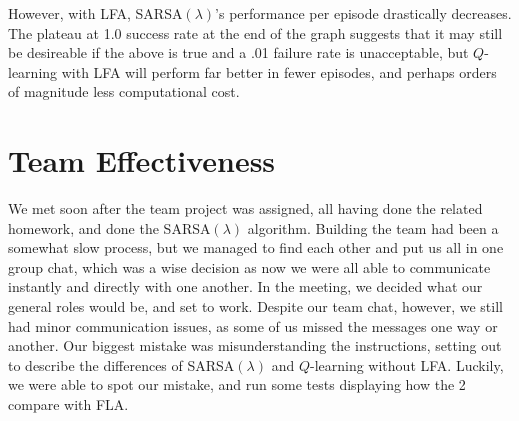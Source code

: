 \documentclass[10pt,conference]{IEEEtran}
\begin{document}
However, with LFA, SARSA\((\lambda)\)'s performance per episode drastically 
decreases. The plateau at 1.0 success rate at the end of the graph suggests that 
it may still be desireable if the above is true and a .01 failure rate is unacceptable, 
but \(Q\)-learning with LFA will perform far better in fewer episodes, and perhaps orders of magnitude less computational cost.


\section{Team Effectiveness}
We met soon after the team project was assigned, all having done the related homework, and done the SARSA\((\lambda)\) algorithm. Building the team had been a somewhat slow process, but we managed to find each other and put us all in one group chat, which was a wise decision as now we were all able to communicate instantly and directly with one another. In the meeting, we decided what our general roles would be, and set to work. Despite our team chat, however, we still had minor communication issues, as some of us missed the messages one way or another. Our biggest mistake was misunderstanding the instructions, setting out to describe the differences of SARSA\((\lambda)\) and \(Q\)-learning without LFA. Luckily, we were able to spot our mistake, and run some tests displaying how the 2 compare with FLA.
\label{sec:team}




\end{document}
